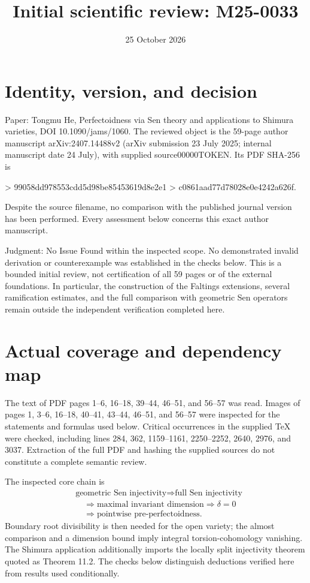 \documentclass[10pt]{article}
\title{Initial scientific review: M25-0033}
\author{}
\date{25 October 2026}
\begin{document}
\maketitle
\section*{Identity, version, and decision}
Paper: Tongmu He, Perfectoidness via Sen theory and applications to Shimura varieties, DOI 10.1090/jams/1060. The reviewed object is the 59-page author manuscript arXiv:2407.14488v2 (arXiv submission 23 July 2025; internal manuscript date 24 July), with supplied source00000TOKEN. Its PDF SHA-256 is\par
> 99058dd978553cdd5d98be85453619d8e2e1
> c0861aad77d78028e0e4242a626f.\par
Despite the source filename, no comparison with the published journal version has been performed. Every assessment below concerns this exact author manuscript.\par
Judgment: No Issue Found within the inspected scope. No demonstrated invalid derivation or counterexample was established in the checks below. This is a bounded initial review, not certification of all 59 pages or of the external foundations. In particular, the construction of the Faltings extensions, several ramification estimates, and the full comparison with geometric Sen operators remain outside the independent verification completed here.\par
\section*{Actual coverage and dependency map}
The text of PDF pages 1–6, 16–18, 39–44, 46–51, and 56–57 was read. Images of pages 1, 3–6, 16–18, 40–41, 43–44, 46–51, and 56–57 were inspected for the statements and formulas used below. Critical occurrences in the supplied TeX were checked, including lines 284, 362, 1159–1161, 2250–2252, 2640, 2976, and 3037. Extraction of the full PDF and hashing the supplied sources do not constitute a complete semantic review.\par
The inspected core chain is \[\begin{aligned}
 &\text{geometric Sen injectivity}
 \Longrightarrow \text{full Sen injectivity}\\
 &\quad\Longrightarrow \text{maximal invariant dimension}
 \Longrightarrow \delta=0\\
 &\quad\Longrightarrow \text{pointwise pre-perfectoidness}.
 \end{aligned}\] Boundary root divisibility is then needed for the open variety; the almost comparison and a dimension bound imply integral torsion-cohomology vanishing. The Shimura application additionally imports the locally split injectivity theorem quoted as Theorem 11.2. The checks below distinguish deductions verified here from results used conditionally.\par
\end{document}
